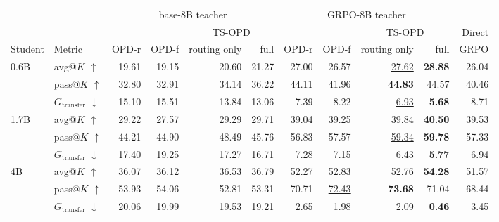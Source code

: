 \setlength{\aboverulesep}{0pt}\setlength{\belowrulesep}{0pt}\renewcommand{\arraystretch}{1.12}
\begin{tabular}{llrrrrrrrr|r}
\toprule
 & & \multicolumn{4}{c}{base-8B teacher} & \multicolumn{4}{c|}{GRPO-8B teacher} & \\
\cmidrule(lr){3-6}\cmidrule(lr){7-10}
 & & & & \multicolumn{2}{c}{TS-OPD} & & & \multicolumn{2}{c|}{TS-OPD} & Direct \\
\cmidrule(lr){5-6}\cmidrule(lr){9-10}
Student & Metric & OPD-r & OPD-f & routing only & full & OPD-r & OPD-f & routing only & full & GRPO \\
\midrule
0.6B & avg@$K$ $\uparrow$ & 19.61 & 19.15 & 20.60 & 21.27 & 27.00 & 26.57 & \underline{27.62} & \textbf{28.88} & 26.04 \\
 & pass@$K$ $\uparrow$ & 32.80 & 32.91 & 34.14 & 36.22 & 44.11 & 41.96 & \textbf{44.83} & \underline{44.57} & 40.46 \\
 & $G_{\mathrm{transfer}}$ $\downarrow$ & 15.10 & 15.51 & 13.84 & 13.06 & 7.39 & 8.22 & \underline{6.93} & \textbf{5.68} & 8.71 \\
\midrule
1.7B & avg@$K$ $\uparrow$ & 29.22 & 27.57 & 29.29 & 29.71 & 39.04 & 39.25 & \underline{39.84} & \textbf{40.50} & 39.53 \\
 & pass@$K$ $\uparrow$ & 44.21 & 44.90 & 48.49 & 45.76 & 56.83 & 57.57 & \underline{59.34} & \textbf{59.78} & 57.33 \\
 & $G_{\mathrm{transfer}}$ $\downarrow$ & 17.40 & 19.25 & 17.27 & 16.71 & 7.28 & 7.15 & \underline{6.43} & \textbf{5.77} & 6.94 \\
\midrule
4B & avg@$K$ $\uparrow$ & 36.07 & 36.12 & 36.53 & 36.79 & 52.27 & \underline{52.83} & 52.76 & \textbf{54.28} & 51.57 \\
 & pass@$K$ $\uparrow$ & 53.93 & 54.06 & 52.81 & 53.31 & 70.71 & \underline{72.43} & \textbf{73.68} & 71.04 & 68.44 \\
 & $G_{\mathrm{transfer}}$ $\downarrow$ & 20.06 & 19.99 & 19.53 & 19.21 & 2.65 & \underline{1.98} & 2.09 & \textbf{0.46} & 3.45 \\
\bottomrule
\end{tabular}
